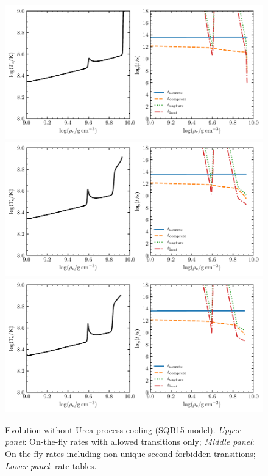 \documentclass[modern]{aastex62}
\begin{document}


\begin{figure}
  \centering
  \includegraphics[width=\textwidth]{SQB15-allowed.pdf}
  \includegraphics[width=\textwidth]{SQB15-nusf11.pdf}
    \includegraphics[width=\textwidth]{SQB15-suzuki.pdf}
  \caption{Evolution without Urca-process cooling (SQB15 model).  \textit{Upper panel}: On-the-fly rates with allowed transitions only;  \textit{Middle panel}: On-the-fly rates including non-unique second forbidden transitions; \textit{Lower panel}: \citet{Suzuki2016a} rate tables.}
\end{figure}
\end{document}
